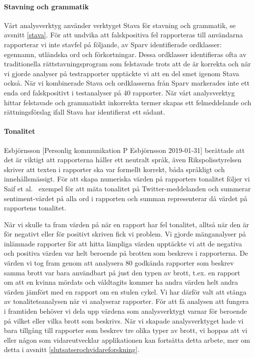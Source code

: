 \documentclass[swedish]{maucsthesis}
\begin{document}
\paragraph*{Stavning och grammatik}

Vårt analysverktyg använder verktyget Stava för stavning och grammatik, se avsnitt \ref{stava}.
För att undvika att falskpositiva fel rapporteras till användarna rapporterar vi inte
stavfel på följande, av Sparv identifierade ordklasser: egennamn, utländska ord och förkortningar.
Dessa ordklasser identifieras ofta av traditionella rättstavningsprogram som felstavade \cite{kann:1997} trots att de är korrekta
och när vi gjorde analyser på testrapporter upptäckte vi att en del smet igenom Stava också.
När vi kombinerade Stava och ordklasserna från Sparv markerades inte ett enda ord falskpositivt i testanalyser på 40 rapporter.
När vårt analysverktyg hittar felstavade och grammatiskt inkorrekta termer skapas ett felmeddelande och rättningsförslag
ifall Stava har identifierat ett sådant.

\paragraph{Tonalitet}

Esbjörnsson [Personlig kommunikation P Esbjörnsson 2019-01-31] berättade att det är viktigt att 
rapporterna håller ett neutralt språk, även Rikspolisstyrelsen~\cite{rfsip} skriver att texten i 
rapporter ska var formellt korrekt, båda språkligt och innehållsmässigt. För att skapa numeriska värden på rapporters tonalitet följer vi Saif et al.~\cite{saif:2016} exempel för att mäta tonalitet på Twitter-meddelanden och summerar sentiment-värdet på alla ord i rapporten och summan representerar då värdet på rapportens tonalitet.

När vi skulle ta fram värden på när en rapport har fel tonalitet, alltså när den är för negativt eller för positivt skriven fick vi problem.
Vi gjorde mänganalyser på inlämnade rapporter för att hitta lämpliga värden upptäckte vi att de negativa och positiva värden var helt beroende på
brotten som beskrevs i rapporterna. De värden vi tog fram genom att analysera 80 godkända rapporter som beskrev samma brott var bara användbart
på just den typen av brott, t.ex. en rapport om att en kvinna mördats och våldtagits kommer ha andra värden helt andra värden jämfört med en rapport om en
stulen cykel. Vi har därför valt att stänga av tonalitetsanalysen när vi analyserar rapporter. För att få analysen att fungera i framtiden
behöver vi dela upp värdena som analysverktygt varnar för beroende på vilket eller vilka brott som beskrivs. När vi skapade analysverktyget
hade vi bara tillgång till rapporter som beskrev tre olika typer av brott, vi hoppas att vi eller någon som vidareutvecklar applikationen
kan fortsätta detta arbete, mer om detta i avsnitt \cref{slutsatserochvidareforskning}.
\end{document}
